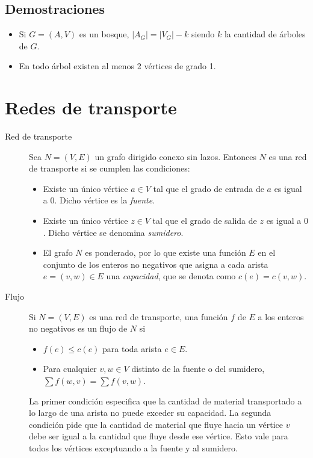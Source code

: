 \subsection{Demostraciones}
\begin{itemize}
	\item Si $G=(A,V)$ es un bosque, $|A_G| = |V_G| - k$ siendo $k$ la cantidad de árboles de $G$.
	\item En todo árbol existen al menos 2 vértices de grado 1.
\end{itemize}

\newpage
\section{Redes de transporte}
\begin{description}
	\item[Red de transporte] Sea $N = (V,E)$ un grafo dirigido conexo sin lazos. 
	Entonces $N$ es una red de transporte si se cumplen las condiciones:
	
	\begin{itemize}
		\item Existe un único vértice $a \in V$ tal que el grado de entrada de $a$ es igual a $0$. Dicho vértice es la \emph{fuente}.
		
		\item Existe un único vértice $z \in V$ tal que el grado de salida de $z$ es igual a $0$. Dicho vértice se denomina \emph{sumidero}.
		
		\item El grafo $N$ es ponderado, por lo que existe una función $E$ en el conjunto de los enteros no negativos que asigna a cada arista $e = (v,w) \in E$ una \emph{capacidad}, que se denota como $c(e) = c(v,w)$.
	\end{itemize}
	
	\item[Flujo] Si $N = (V,E)$ es una red de transporte, una función $f$ de $E$ a los enteros no negativos es un flujo de $N$ si
	\begin{itemize}
		\item $f(e) \le c(e)$ para toda arista $e \in E$.
		\item Para cualquier $v,w \in V$ distinto de la fuente o del sumidero, $\sum f(w,v) = \sum f(v,w)$.
	\end{itemize}
	
	La primer condición especifica que la cantidad de material transportado a lo largo de una arista no puede exceder su capacidad.
	La segunda condición pide que la cantidad de material que fluye hacia un vértice $v$ debe ser igual a la cantidad que fluye desde ese vértice.
	Esto vale para todos los vértices exceptuando a la fuente y al sumidero.
	

\end{description}
